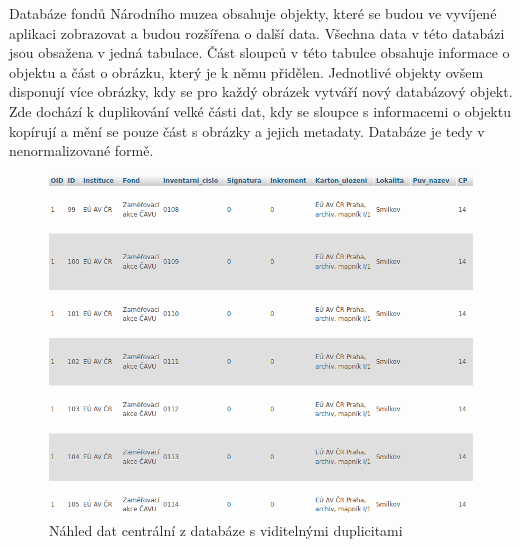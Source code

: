 Databáze fondů Národního muzea obsahuje objekty, které se budou ve 
vyvíjené aplikaci zobrazovat a budou rozšířena o další data. Všechna data 
v této databázi jsou obsažena v jedná tabulace. Část sloupců v této tabulce 
obsahuje informace o objektu a část o obrázku, který je k němu přidělen. 
Jednotlivé objekty ovšem disponují více obrázky, kdy se pro každý obrázek
vytváří nový databázový objekt. Zde dochází k duplikování velké části dat, 
kdy se sloupce s informacemi o objektu kopírují a mění se pouze část s 
obrázky a jejich metadaty. Databáze je tedy v nenormalizované formě.

\begin{figure}[H] \centering
    \includegraphics[width=420pt]{./pictures/5-ukazka-basedata.PNG}
    \caption[Náhled dat z centrální databáze s viditelnými duplicitami]{Náhled dat centrální z databáze s viditelnými duplicitami}
	\label{fig:Náhled dat z centrální databáze s viditelnými duplicitami}              
\end{figure}


